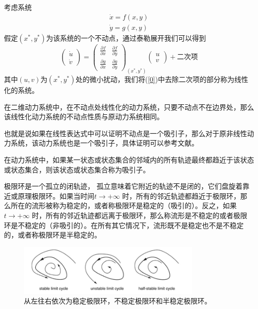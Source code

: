 考虑系统
\begin{equation}
    \begin{aligned}
        \dot{x}=f(x,y)\\
        \dot{y}=g(x,y)
    \end{aligned}
\end{equation}
假定$(x^*,y^*)$为该系统的一个不动点，通过泰勒展开我们可以得到
\begin{equation}\label{0}
    \begin{pmatrix}
        \dot{u}\\
        \dot{v}
    \end{pmatrix}=
    \begin{pmatrix}
        \frac{\partial f}{\partial x} & \frac{\partial f}{\partial y}\\
        \frac{\partial g}{\partial x} & \frac{\partial g}{\partial y}
    \end{pmatrix}_{(x^*,y^*)}\begin{pmatrix}
        u\\ v
    \end{pmatrix}+\text{二次项}
\end{equation}
其中$(u,v)$为$(x^*,y^*)$处的微小扰动，我们将(\ref{0})中去除二次项的部分称为线性化的系统。
\begin{prop}
    在二维动力系统中，在不动点处线性化的动力系统，只要不动点不在边界处，那么该线性化动力系统的不动点性质与原动力系统相同。
\end{prop}

也就是说如果在线性表达式中可以证明不动点是一个吸引子，那么对于原非线性动力系统，该动力系统也是一个吸引子，具体证明可以参考文献\cite{andronov1974qualitative}。
\begin{defn}[吸引子]
    在动力系统中，如果某一状态或状态集合的邻域内的所有轨迹最终都趋近于该状态或状态集合，则该状态或状态集合称为吸引子。
\end{defn}
    
\begin{defn}[极限环]
    极限环是一个孤立的闭轨迹， 孤立意味着它附近的轨迹不是闭的，它们盘旋着靠近或原理极限环。如果当时间$t\to +\infty$ 时，所有的邻近轨迹都趋近于极限环，那么所在的流形被称为稳定的，或者称极限环是稳定的（吸引的）。反之，如果$t\to +\infty$ 时，所有的邻近轨迹都远离于极限环，那么称流形是不稳定的或者极限环是不稳定的（非吸引的）。在所有其它情况下，流形既不是稳定也不是不稳定的，或者称极限环是半稳定的。
\end{defn}

\begin{figure}[H]
    \centering
    \includegraphics[width=0.8\textwidth]{Img/limit_cycle.png}
    \caption{从左往右依次为稳定极限环，不稳定极限环和半稳定极限环。}
    \label{fig:limit_cycle}
\end{figure}

